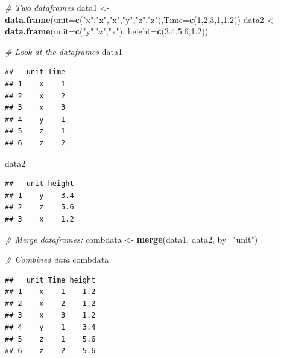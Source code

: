 \documentclass[]{book}
\newenvironment{Shaded}{\begin{snugshade}}{\end{snugshade}}
\newcommand{\CommentTok}[1]{\textcolor[rgb]{0.56,0.35,0.01}{\textit{#1}}}
\newcommand{\DataTypeTok}[1]{\textcolor[rgb]{0.13,0.29,0.53}{#1}}
\newcommand{\DecValTok}[1]{\textcolor[rgb]{0.00,0.00,0.81}{#1}}
\newcommand{\FloatTok}[1]{\textcolor[rgb]{0.00,0.00,0.81}{#1}}
\newcommand{\KeywordTok}[1]{\textcolor[rgb]{0.13,0.29,0.53}{\textbf{#1}}}
\newcommand{\NormalTok}[1]{#1}
\newcommand{\StringTok}[1]{\textcolor[rgb]{0.31,0.60,0.02}{#1}}
\begin{document}
\begin{Shaded}
\begin{Highlighting}[]
\CommentTok{# Two dataframes}
\NormalTok{data1 <-}\StringTok{ }\KeywordTok{data.frame}\NormalTok{(}\DataTypeTok{unit=}\KeywordTok{c}\NormalTok{(}\StringTok{"x"}\NormalTok{,}\StringTok{"x"}\NormalTok{,}\StringTok{"x"}\NormalTok{,}\StringTok{"y"}\NormalTok{,}\StringTok{"z"}\NormalTok{,}\StringTok{"z"}\NormalTok{),}\DataTypeTok{Time=}\KeywordTok{c}\NormalTok{(}\DecValTok{1}\NormalTok{,}\DecValTok{2}\NormalTok{,}\DecValTok{3}\NormalTok{,}\DecValTok{1}\NormalTok{,}\DecValTok{1}\NormalTok{,}\DecValTok{2}\NormalTok{))}
\NormalTok{data2 <-}\StringTok{ }\KeywordTok{data.frame}\NormalTok{(}\DataTypeTok{unit=}\KeywordTok{c}\NormalTok{(}\StringTok{"y"}\NormalTok{,}\StringTok{"z"}\NormalTok{,}\StringTok{"x"}\NormalTok{), }\DataTypeTok{height=}\KeywordTok{c}\NormalTok{(}\FloatTok{3.4}\NormalTok{,}\FloatTok{5.6}\NormalTok{,}\FloatTok{1.2}\NormalTok{))}

\CommentTok{# Look at the dataframes}
\NormalTok{data1}
\end{Highlighting}
\end{Shaded}

\begin{verbatim}
##   unit Time
## 1    x    1
## 2    x    2
## 3    x    3
## 4    y    1
## 5    z    1
## 6    z    2
\end{verbatim}

\begin{Shaded}
\begin{Highlighting}[]
\NormalTok{data2}
\end{Highlighting}
\end{Shaded}

\begin{verbatim}
##   unit height
## 1    y    3.4
## 2    z    5.6
## 3    x    1.2
\end{verbatim}

\begin{Shaded}
\begin{Highlighting}[]
\CommentTok{# Merge dataframes:}
\NormalTok{combdata <-}\StringTok{ }\KeywordTok{merge}\NormalTok{(data1, data2, }\DataTypeTok{by=}\StringTok{"unit"}\NormalTok{)}

\CommentTok{# Combined data}
\NormalTok{combdata}
\end{Highlighting}
\end{Shaded}

\begin{verbatim}
##   unit Time height
## 1    x    1    1.2
## 2    x    2    1.2
## 3    x    3    1.2
## 4    y    1    3.4
## 5    z    1    5.6
## 6    z    2    5.6
\end{verbatim}
\end{document}

